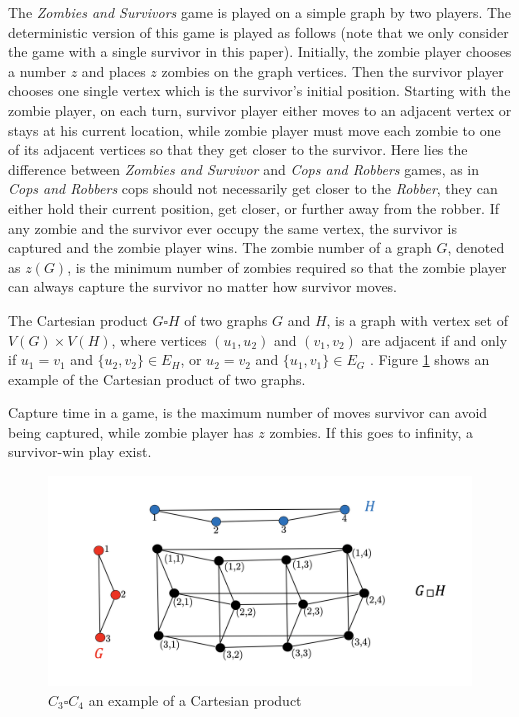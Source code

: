 \documentclass[1p]{elsarticle}
\begin{document}
The {\it Zombies and Survivors} game is played on a simple graph by two players. The deterministic version of this game
\cite{Fitz16} is played as follows (note that we only consider the game with a single survivor in this paper).
Initially, the zombie player chooses a number $z$ and places $z$ zombies on the graph vertices. Then the survivor player
chooses one single vertex which is the survivor's initial position. Starting with the zombie player, on each turn,
survivor player either moves to an adjacent vertex or stays at his current location, while zombie player must move each
zombie to one of its adjacent vertices so that they get closer to the survivor. Here lies the difference between {\it
Zombies and Survivor} and {\it Cops and Robbers} games, as in {\it Cops and Robbers} cops should not necessarily get
closer to the {\it Robber}, they can either hold their current position, get closer, or further away from the robber. If
any zombie and the survivor ever occupy the same vertex, the survivor is captured and the zombie player wins. The zombie
number of a graph $G$, denoted as $z(G)$, is the minimum number of zombies required so that the zombie player can always
capture the survivor no matter how survivor moves.

The Cartesian product $G \square H$ of two graphs $G$ and $H$, is a graph with vertex set of $V(G) \times V(H)$, where
vertices $(u_1 , u_2)$ and $(v_1 , v_2)$ are adjacent if and only if $u_1 = v_1$ and $ \{ u_2 , v_2 \} \in E_{H} $, or
$u_2 = v_2$ and $ \{u_1 , v_1 \} \in E_{G}$ \cite{West02}. Figure \ref{fig:p2} shows an example of the Cartesian product
of two graphs.

Capture time in a game, is the maximum number of moves survivor can avoid being captured, while zombie player has $z$
zombies. If this goes to infinity, a survivor-win play exist.

\begin{figure}[h!]
	\centering
	\includegraphics[width=0.9\linewidth]{fig/CpWest.png}
	\caption{$C_3 \square C_4$ an example of a Cartesian product}
	\label{fig:p2}
\end{figure}
\end{document}
